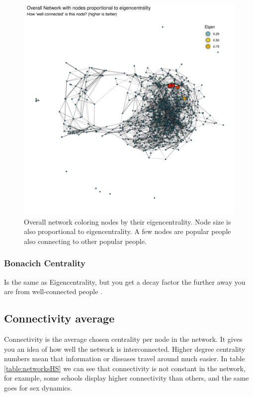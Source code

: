     \begin{figure}[h!]
        \centering
            \includegraphics[width=0.9\linewidth]{figures/Networks/Centralities/Graph_overallEdgesDF_centralitiesDF_Eigen___mds.png} 
        \caption{Overall network coloring nodes by their eigencentrality. Node size is also proportional to eigencentrality. A few nodes are popular people also connecting to other popular people.}
        \label{figure:networksEigen}
    \end{figure}      

\subsubsection{Bonacich Centrality}
 
Is the same as Eigencentrality, but you get a decay factor the further away you are from well-connected people \cite{Bonacich1972}.

\subsection{Connectivity average}

Connectivity is the average chosen centrality per node in the network. It gives you an idea of how well the network is interconnected. Higher degree centrality numbers mean that information or diseases travel around much easier. In table \ref{table:networksHS} we can see that connectivity is not constant in the network, for example, some schools display higher connectivity than others, and the same goes for sex dynamics.


